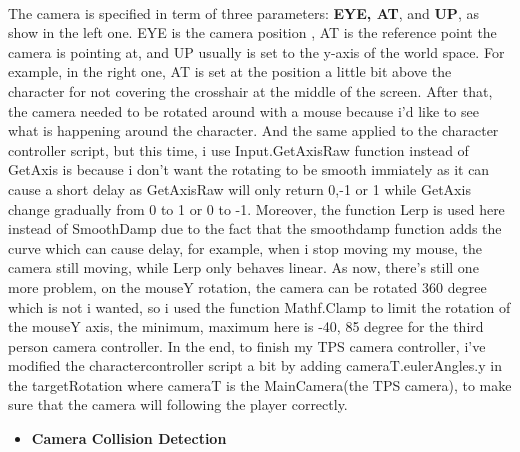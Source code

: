 \documentclass[a4paper, 13pt]{extarticle}
\begin{document}
  	\\[0.05cm]
 	 The camera is specified in term of three parameters: {\bfseries EYE, AT}, and {\bfseries UP}, as show in the left one. EYE is the camera position , AT is the reference point the camera is pointing at, and UP usually is set to the y-axis of the world space. For example, in the right one, AT is set at the position a little bit above the character for not covering the crosshair at the middle of the screen.
 	 After that, the camera needed to be rotated around with a mouse because i'd like to see what is happening around the character. And the same applied to the character controller script, but this time, i use Input.GetAxisRaw function instead of GetAxis is because i don't want the rotating to be smooth immiately as it can cause a short delay as GetAxisRaw will only return 0,-1 or 1 while GetAxis change gradually from 0 to 1 or 0 to -1.  
 	 Moreover, the function Lerp is used here instead of SmoothDamp due to the fact that the smoothdamp function adds the curve which can cause delay, for example, when i stop moving my mouse, the camera still moving, while Lerp only behaves linear. As now, there's still one more problem, on the mouseY rotation, the camera can be rotated 360 degree which is not i wanted, so i used the function Mathf.Clamp to limit the rotation of the mouseY axis, the minimum, maximum here is -40, 85 degree for the third person camera controller. In the end, to finish my TPS camera controller, i've modified the charactercontroller script a bit by adding cameraT.eulerAngles.y in the targetRotation where cameraT is the MainCamera(the TPS camera), to make sure that the camera will following the player correctly.
 	 
 	  \begin{itemize}
 	 	\item \bfseries Camera Collision Detection 
 	 \end{itemize}
 	 
 	 	
 	 	
 	 	
  	
\end{document}
